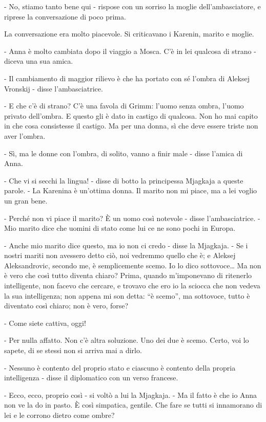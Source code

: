 - No, stiamo tanto bene qui - rispose con un sorriso la moglie dell'ambasciatore, e riprese la conversazione di poco prima. 

La conversazione era molto piacevole. Si criticavano i Karenin, marito e moglie. 

- Anna è molto cambiata dopo il viaggio a Mosca. C'è in lei qualcosa di strano - diceva una sua amica. 

- Il cambiamento di maggior rilievo è che ha portato con sé l'ombra di Aleksej Vronskij - disse l'ambasciatrice. 

- E che c'è di strano? C'è una favola di Grimm: l'uomo senza ombra, l'uomo privato dell'ombra. E questo gli è dato in castigo di qualcosa. Non ho mai capito in che cosa consistesse il castigo. Ma per una donna, sì che deve essere triste non aver l'ombra. 

- Sì, ma le donne con l'ombra, di solito, vanno a finir male - disse l'amica di Anna. 

- Che vi si secchi la lingua! - disse di botto la principessa Mjagkaja a queste parole. - La Karenina è un'ottima donna. Il marito non mi piace, ma a lei voglio un gran bene. 

- Perché non vi piace il marito? È un uomo così notevole - disse l'ambasciatrice. - Mio marito dice che uomini di stato come lui ce ne sono pochi in Europa. 

- Anche mio marito dice questo, ma io non ci credo - disse la Mjagkaja. - Se i nostri mariti non avessero detto ciò, noi vedremmo quello che è; e Aleksej Aleksandrovic, secondo me, è semplicemente scemo. Io lo dico sottovoce\ldots{} Ma non è vero che così tutto diventa chiaro? Prima, quando m'imponevano di ritenerlo intelligente, non facevo che cercare, e trovavo che ero io la sciocca che non vedeva la sua intelligenza; non appena mi son detta: ``è scemo'', ma sottovoce, tutto è diventato così chiaro; non è vero, forse? 

- Come siete cattiva, oggi! 

- Per nulla affatto. Non c'è altra soluzione. Uno dei due è scemo. Certo, voi lo sapete, di se stessi non si arriva mai a dirlo. 

- Nessuno è contento del proprio stato e ciascuno è contento della propria intelligenza - disse il diplomatico con un verso francese. 

- Ecco, ecco, proprio così - si voltò a lui la Mjagkaja. - Ma il fatto è che io Anna non ve la do in pasto. È così simpatica, gentile. Che fare se tutti si innamorano di lei e le corrono dietro come ombre? 

